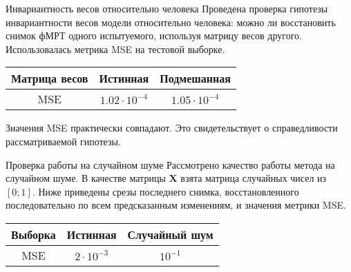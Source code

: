 \documentclass{beamer}
\begin{document}
\begin{frame}{Инвариантность весов относительно человека}
    Проведена проверка гипотезы инвариантности весов модели относительно человека:
	можно ли восстановить снимок фМРТ одного испытуемого, используя
	матрицу весов другого. Использовалась метрика MSE на тестовой выборке.
    \begin{table}[h!]
		\centering
		\begin{tabular}{|c|c|c|}
			\hline
			Матрица весов	&	Истинная	&	Подмешанная\footnotemark[1] \\ \hline \hline
			MSE		& 	$1.02 \cdot 10^{-4}$	 &		$1.05 \cdot 10^{-4}$ \\ \hline
		\end{tabular}
		\label{table:1}
	\end{table}
    Значения MSE практически совпадают. Это свидетельствует о справедливости рассматриваемой гипотезы. 
\end{frame}
\begin{frame}{Проверка работы на случайном шуме}
    Рассмотрено качество работы метода на случайном шуме. В качестве матрицы $\mathbf{X}$
	взята матрица случайных чисел из $[0; 1]$. Ниже приведены срезы последнего снимка, восстановленного
    последовательно по всем предсказанным изменениям, и значения метрики MSE.
	\begin{figure}[h!]
		\centering
		\hfill
		\hfill
		\label{fig:8}
	\end{figure}
    \begin{table}[h!]
		\centering
		\begin{tabular}{|c|c|c|}
			\hline
			Выборка	&	Истинная	&	Случайный шум \\ \hline \hline
			MSE		& 	$2 \cdot 10^{-3}$	 &		$10^{-1}$ \\ \hline
		\end{tabular}
		\label{table:2}
	\end{table}    
\end{frame}
\end{document}
